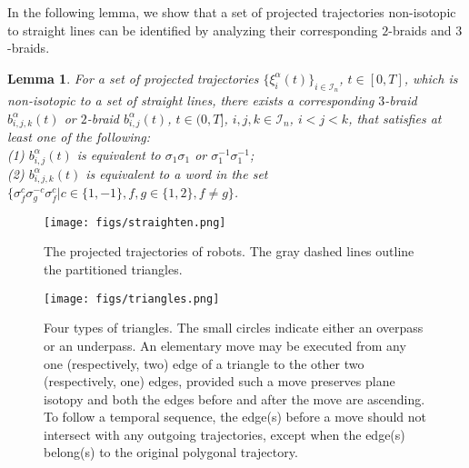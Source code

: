 \documentclass[conference]{IEEEtran}
\newtheorem{lem}[thm]{Lemma}
\newcommand*{\myset}[1]{\mathcal{#1}} %
\newcommand*{\timet}{T} %
\newcommand*{\sptime}{\xi} %
\newcommand*{\projang}{\alpha} %
\newcommand*{\btau}{\tau} %
\newcommand*{\bgen}{\sigma} %
\newcommand*{\word}{b} %
\newcommand*{\entangledef}{\phi} %
\newcommand*{\identity}{e}
\newcommand*{\dummyc}{c}
\newcommand*{\dummyf}{f}
\newcommand*{\dummyg}{g}
\begin{document}
In the following lemma, we show that a set of projected trajectories non-isotopic to straight lines can be identified by analyzing their corresponding $2$-braids and $3$-braids.
\begin{lem}\label{lm:braidword}
    For a set of projected trajectories $\{\sptime_i^{\projang}(t)\}_{i\in\myset{I}_n}$, $t\in[0,\timet]$, which is non-isotopic to a set of straight lines, 
    there exists a corresponding $3$-braid $\word^\projang_{i,j,k}(t)$ or $2$-braid $\word^\projang_{i,j}(t)$,
    $t\in(0,\timet]$, $i,j,k\in\myset{I}_n$, $i<j<k$, that satisfies at least one of the following:\\
    (1) $\word^\projang_{i,j}(t)$ is equivalent to $\bgen_1\bgen_1$ or $\bgen_1^{-1}\bgen_1^{-1}$;\\
    (2) $\word^\projang_{i,j,k}(t)$ is equivalent to a word in the set 
    $\{\bgen_\dummyf^{\dummyc}\bgen^{-\dummyc}_\dummyg\bgen_\dummyf^{\dummyc}|\dummyc\in\{1,-1\},\dummyf,\dummyg\in\{1,2\}, \dummyf\neq g \}$.

\end{lem}
\begin{figure}[!t]
\centering
\texttt{[image: figs/straighten.png]}
\caption{\footnotesize The projected trajectories of robots. The gray dashed lines outline the partitioned triangles.}
\label{fig: straighten}
\end{figure}
\begin{figure}[!t]
\centering
\texttt{[image: figs/triangles.png]}
\caption{\footnotesize Four types of triangles. The small circles indicate either an overpass or an underpass.
An elementary move may be executed from any one (respectively, two) edge of a triangle to the other two (respectively, one) edges, 
provided such a move preserves plane isotopy and both the edges before and after the move are ascending.
To follow a temporal sequence, the edge(s) before a move should not intersect with any outgoing trajectories, except when the edge(s) belong(s) to the original polygonal trajectory.}
\label{fig: triangles}
\end{figure}
\end{document}
